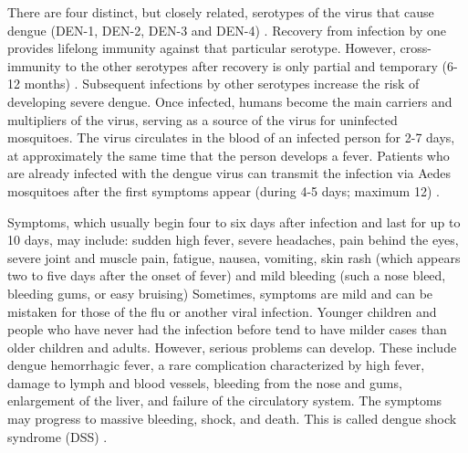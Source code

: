 \documentclass[review]{elsarticle}
\begin{document}
There are four distinct, but closely related, serotypes of the virus that cause dengue (DEN-1, DEN-2, DEN-3 and DEN-4) \cite{gubler1995dengue,whodenvtype2015}. Recovery from infection by one provides lifelong immunity against that particular serotype. However, cross-immunity to the other serotypes after recovery is only partial and temporary (6-12 months) \cite{gubler1995dengue}. Subsequent infections by other serotypes increase the risk of developing severe dengue. Once infected, humans become the main carriers and multipliers of the virus, serving as a source of the virus for uninfected mosquitoes. The virus circulates in the blood of an infected person for 2-7 days, at approximately the same time that the person develops a fever. Patients who are already infected with the dengue virus can transmit the infection via Aedes mosquitoes after the first symptoms appear (during 4-5 days; maximum 12) \cite{whodenvsym2015}.

Symptoms, which usually begin four to six days after infection and last for up to 10 days, may include: sudden high fever, severe headaches, pain behind the eyes, severe joint and muscle pain, fatigue, nausea, vomiting, skin rash (which appears two to five days after the onset of fever) and mild bleeding (such a nose bleed, bleeding gums, or easy bruising) Sometimes, symptoms are mild and can be mistaken for those of the flu or another viral infection. Younger children and people who have never had the infection before tend to have milder cases than older children and adults. However, serious problems can develop. These include dengue hemorrhagic fever, a rare complication characterized by high fever, damage to lymph and blood vessels, bleeding from the nose and gums, enlargement of the liver, and failure of the circulatory system. The symptoms may progress to massive bleeding, shock, and death. This is called dengue shock syndrome (DSS) \cite{webmdsymptoms2015}. 
\end{document}
